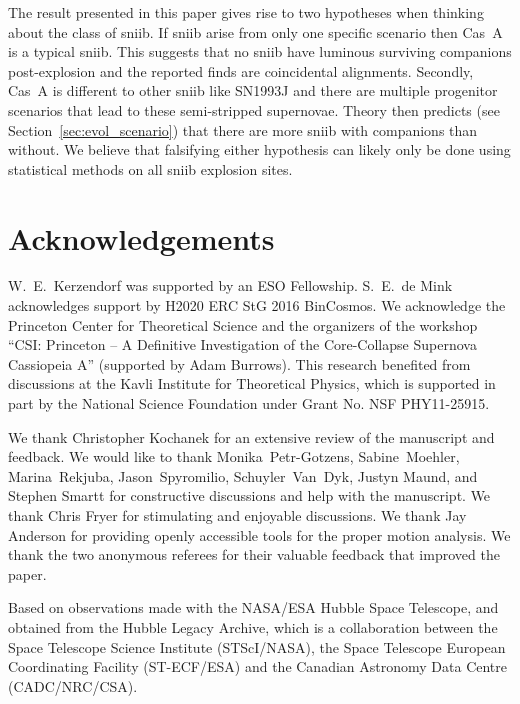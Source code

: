 \documentclass{aa}
\begin{document}
The result presented in this paper gives rise to two hypotheses when thinking about the class of \gls{sniib}. If \gls{sniib} arise from only one specific scenario then Cas~A is a typical \gls{sniib}. This suggests that no \gls{sniib} have luminous surviving companions post-explosion and the reported finds are coincidental alignments. Secondly, Cas~A is different to other \gls{sniib} like SN{1993}{J} and there are multiple progenitor scenarios that lead to these semi-stripped supernovae. Theory then predicts (see Section~\ref{sec:evol_scenario}) that there are more \gls{sniib} with companions than without. We believe that falsifying either hypothesis can likely only be done using statistical methods on all \gls{sniib} explosion sites.

\section{Acknowledgements}

W.~E.~Kerzendorf was supported by an ESO Fellowship. S.~E.~de Mink acknowledges support by H2020 ERC StG 2016 BinCosmos. We acknowledge the Princeton Center for Theoretical Science and the organizers of the workshop ``CSI: Princeton -- A Definitive Investigation of the Core-Collapse Supernova Cassiopeia A'' (supported by Adam Burrows).  This research benefited from discussions at the Kavli Institute for Theoretical Physics, which is supported in part by the National Science Foundation under Grant No. NSF PHY11-25915.

We thank Christopher Kochanek for an extensive review of the manuscript and feedback. We would like to thank Monika~Petr-Gotzens, Sabine~Moehler, Marina~Rekjuba, Jason~Spyromilio, Schuyler~Van~Dyk, Justyn Maund, and Stephen Smartt for constructive discussions and help with the manuscript.  We thank Chris Fryer for stimulating and enjoyable discussions. We thank Jay Anderson for providing openly accessible tools for the proper motion analysis. We thank the two anonymous referees for their valuable feedback that improved the paper. 

Based on observations made with the NASA/ESA Hubble Space Telescope, and obtained from the Hubble Legacy Archive, which is a collaboration between the Space Telescope Science Institute (STScI/NASA), the Space Telescope European Coordinating Facility (ST-ECF/ESA) and the Canadian Astronomy Data Centre (CADC/NRC/CSA).
\end{document}
